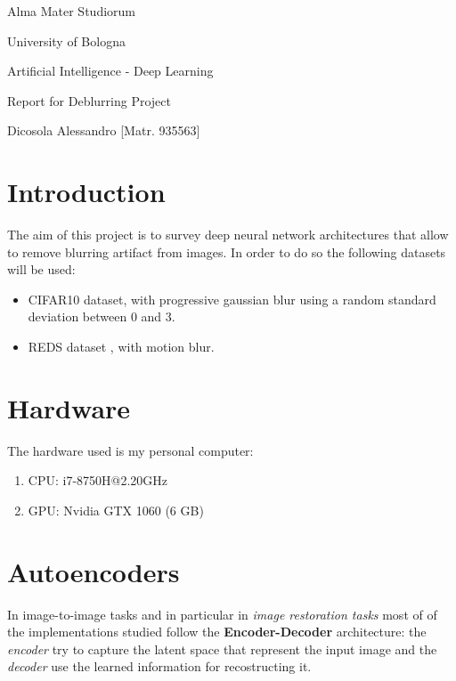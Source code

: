 \documentclass{article}
\begin{document}
\begin{titlepage}
    \vspace*{1cm}

    \begin{center}
        \Huge{Alma Mater Studiorum 
        
        University of Bologna }
    \end{center}

    \vspace*{5 cm}
    \begin{center}
        \LARGE{Artificial Intelligence - Deep Learning}

        \Large Report for Deblurring Project

        \large {Dicosola Alessandro [Matr. 935563]}
    \end{center}
\end{titlepage}

\section{Introduction}
The aim of this project is to survey deep neural network architectures that allow to remove blurring artifact from images.
\newline
In order to do so the following datasets will be used:
\begin{itemize}
    \item CIFAR10 \cite{cifar10dataset} dataset, with progressive gaussian blur using a random standard deviation between 0 and 3.
    \item REDS\cite{redsdataset} dataset , with motion blur.
\end{itemize}
\section{Hardware}
The hardware used is my personal computer:
\begin{enumerate}
    \item CPU: i7-8750H@2.20GHz
    \item GPU: Nvidia GTX 1060 (6 GB)
\end{enumerate}

\section{Autoencoders}
In image-to-image tasks and in particular in \textit{image restoration tasks} most of of the implementations studied follow the \textbf{Encoder-Decoder} architecture: the \textit{encoder} try to capture the latent space that represent the input image and the \textit{decoder} use the learned information for recostructing it.
\end{document}
